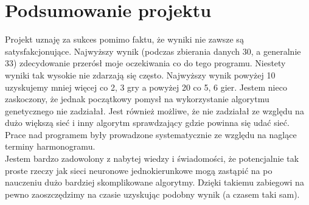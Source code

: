 \documentclass{article}
\begin{document}
\section{Podsumowanie projektu}
    Projekt uznaję za sukces pomimo faktu, że wyniki nie zawsze są satysfakcjonujące. Najwyższy wynik (podczas zbierania danych 30, a generalnie 33) zdecydowanie przerósł moje oczekiwania co do tego programu. Niestety wyniki tak wysokie nie zdarzają się często. Najwyższy wynik powyżej 10 uzyskujemy mniej więcej co 2, 3 gry a powyżej 20 co 5, 6 gier. Jestem nieco zaskoczony, że jednak początkowy pomysł na wykorzystanie algorytmu genetycznego nie zadziałał. Jest również możliwe, że nie zadziałał ze względu na dużo większą sieć i inny algorytm sprawdzający gdzie powinna się udać sieć. \\
    Prace nad programem były prowadzone systematycznie ze względu na naglące terminy harmonogramu.\\
    Jestem bardzo zadowolony z nabytej wiedzy i świadomości, że potencjalnie tak proste rzeczy jak sieci neuronowe jednokierunkowe mogą zastąpić na po nauczeniu dużo bardziej skomplikowane algorytmy. Dzięki takiemu zabiegowi na pewno zaoszczędzimy na czasie uzyskując podobny wynik (a czasem taki sam). 
\end{document}
